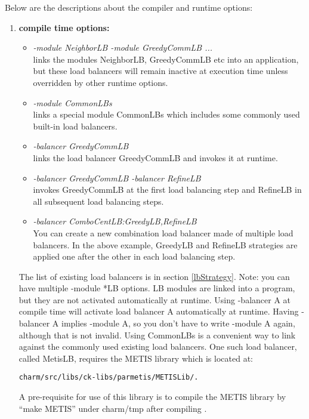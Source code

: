 Below are the descriptions about the compiler and runtime options:

\begin{enumerate}
\item {\bf compile time options:}

\begin{itemize}
\item {\em -module NeighborLB -module GreedyCommLB ...}  \\
  links the modules NeighborLB, GreedyCommLB etc into an application, but these
load balancers will remain inactive at execution time unless overridden by other
runtime options.
\item {\em -module CommonLBs} \\
  links a special module CommonLBs which includes some commonly used \charmpp{}
built-in load balancers.
\item {\em -balancer GreedyCommLB} \\
  links the load balancer GreedyCommLB and invokes it at runtime.
\item {\em -balancer GreedyCommLB -balancer RefineLB} \\
  invokes GreedyCommLB at the first load balancing step and RefineLB in all
subsequent load balancing steps.
\item {\em -balancer ComboCentLB:GreedyLB,RefineLB}  \\
  You can create a new combination load balancer made of multiple
load balancers. In the above example, GreedyLB and RefineLB strategies are
applied one after the other in each load balancing step.
\end{itemize}

The list of existing load balancers is in section
\ref{lbStrategy}. Note: you can have multiple -module *LB options. LB
modules are linked into a program, but they are not activated
automatically at runtime.  Using -balancer A at compile time will
activate load balancer A automatically at runtime.  Having -balancer A
implies -module A, so you don't have to write -module A again,
although that is not invalid.  Using CommonLBs is a convenient way to
link against the commonly used existing load balancers.  One such load
balancer, called MetisLB, requires the METIS library which is located
at: 

\tt{charm/src/libs/ck-libs/parmetis/METISLib/.}

A pre-requisite for use of this library is to compile the METIS
library by ``make METIS'' under charm/tmp after compiling \charmpp{}.


\end{enumerate}
